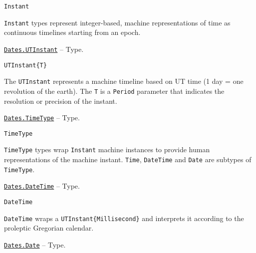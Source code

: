 \begin{adjustwidth}{2em}{0pt}


\begin{verbatim}
Instant
\end{verbatim}

\texttt{Instant} types represent integer-based, machine representations of time as continuous timelines starting from an epoch.



\end{adjustwidth}
\hypertarget{5087474460137130402}{}
\hyperlink{5087474460137130402}{\texttt{Dates.UTInstant}}  -- {Type.}

\begin{adjustwidth}{2em}{0pt}


\begin{verbatim}
UTInstant{T}
\end{verbatim}

The \texttt{UTInstant} represents a machine timeline based on UT time (1 day = one revolution of the earth). The \texttt{T} is a \texttt{Period} parameter that indicates the resolution or precision of the instant.



\end{adjustwidth}
\hypertarget{4438614350756187528}{}
\hyperlink{4438614350756187528}{\texttt{Dates.TimeType}}  -- {Type.}

\begin{adjustwidth}{2em}{0pt}


\begin{verbatim}
TimeType
\end{verbatim}

\texttt{TimeType} types wrap \texttt{Instant} machine instances to provide human representations of the machine instant. \texttt{Time}, \texttt{DateTime} and \texttt{Date} are subtypes of \texttt{TimeType}.



\end{adjustwidth}
\hypertarget{17572689933274889838}{}
\hyperlink{17572689933274889838}{\texttt{Dates.DateTime}}  -- {Type.}

\begin{adjustwidth}{2em}{0pt}


\begin{verbatim}
DateTime
\end{verbatim}

\texttt{DateTime} wraps a \texttt{UTInstant\{Millisecond\}} and interprets it according to the proleptic Gregorian calendar.



\end{adjustwidth}
\hypertarget{4488183467971164548}{}
\hyperlink{4488183467971164548}{\texttt{Dates.Date}}  -- {Type.}

